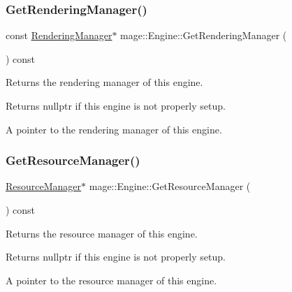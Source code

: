 \subsubsection{\texorpdfstring{Get\+Rendering\+Manager()}{GetRenderingManager()}}
{\footnotesize\ttfamily const \hyperlink{classmage_1_1_rendering_manager}{Rendering\+Manager}$\ast$ mage\+::\+Engine\+::\+Get\+Rendering\+Manager (\begin{DoxyParamCaption}{ }\end{DoxyParamCaption}) const\hspace{0.3cm}{\ttfamily [noexcept]}}

Returns the rendering manager of this engine.

\begin{DoxyReturn}{Returns}
{\ttfamily nullptr} if this engine is not properly setup. 

A pointer to the rendering manager of this engine. 
\end{DoxyReturn}
\hypertarget{classmage_1_1_engine_a8b89ee555f5208a99872d724389eba0b}{}\label{classmage_1_1_engine_a8b89ee555f5208a99872d724389eba0b} 
\subsubsection{\texorpdfstring{Get\+Resource\+Manager()}{GetResourceManager()}}
{\footnotesize\ttfamily \hyperlink{classmage_1_1_resource_manager}{Resource\+Manager}$\ast$ mage\+::\+Engine\+::\+Get\+Resource\+Manager (\begin{DoxyParamCaption}{ }\end{DoxyParamCaption}) const\hspace{0.3cm}{\ttfamily [noexcept]}}

Returns the resource manager of this engine.

\begin{DoxyReturn}{Returns}
{\ttfamily nullptr} if this engine is not properly setup. 

A pointer to the resource manager of this engine. 
\end{DoxyReturn}
\hypertarget{classmage_1_1_engine_adaec74f633fe6ed3a3e2ec745cd57343}{}\label{classmage_1_1_engine_adaec74f633fe6ed3a3e2ec745cd57343} 
